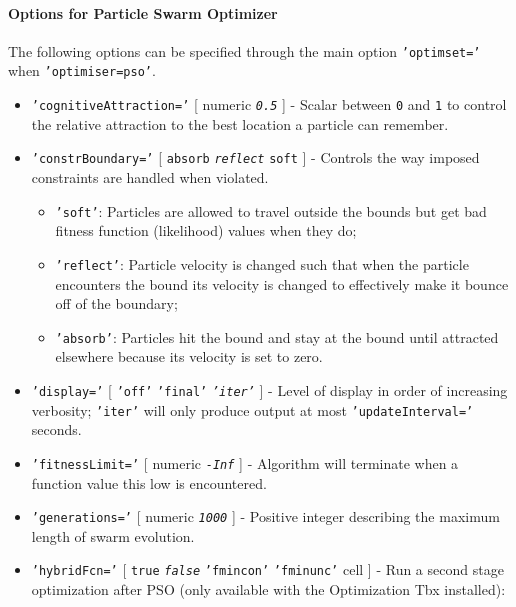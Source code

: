  \paragraph{Options for Particle Swarm Optimizer}
 
 The following options can be specified through the main option
 \texttt{'optimset='} when \texttt{'optimiser=pso'}.
 
 \begin{itemize}
 \item
   \texttt{'cognitiveAttraction='} {[} numeric \textbar{}
   \emph{\texttt{0.5}} {]} - Scalar between \texttt{0} and \texttt{1} to
   control the relative attraction to the best location a particle can
   remember.
 \item
   \texttt{'constrBoundary='} {[} \texttt{absorb} \textbar{}
   \emph{\texttt{reflect}} \textbar{} \texttt{soft} {]} - Controls the
   way imposed constraints are handled when violated.
 
   \begin{itemize}
   \item
     \texttt{'soft'}: Particles are allowed to travel outside the bounds
     but get bad fitness function (likelihood) values when they do;
   \item
     \texttt{'reflect'}: Particle velocity is changed such that when the
     particle encounters the bound its velocity is changed to effectively
     make it bounce off of the boundary;
   \item
     \texttt{'absorb'}: Particles hit the bound and stay at the bound
     until attracted elsewhere because its velocity is set to zero.
   \end{itemize}
 \item
   \texttt{'display='} {[} \texttt{'off'} \textbar{} \texttt{'final'}
   \textbar{} \emph{\texttt{'iter'}} {]} - Level of display in order of
   increasing verbosity; \texttt{'iter'} will only produce output at most
   \texttt{'updateInterval='} seconds.
 \item
   \texttt{'fitnessLimit='} {[} numeric \textbar{} \emph{\texttt{-Inf}}
   {]} - Algorithm will terminate when a function value this low is
   encountered.
 \item
   \texttt{'generations='} {[} numeric \textbar{} \emph{\texttt{1000}}
   {]} - Positive integer describing the maximum length of swarm
   evolution.
 \item
   \texttt{'hybridFcn='} {[} \texttt{true} \textbar{}
   \emph{\texttt{false}} \textbar{} \texttt{'fmincon'} \textbar{}
   \texttt{'fminunc'} \textbar{} cell {]} - Run a second stage
   optimization after PSO (only available with the Optimization Tbx
   installed):
 

\end{itemize}

